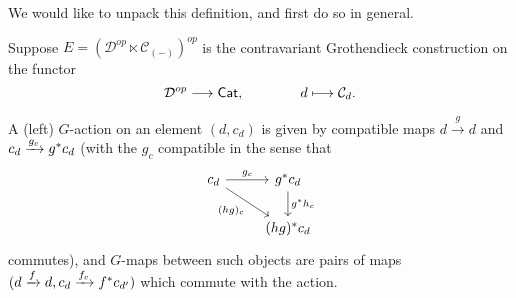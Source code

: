 \documentclass[a4paper,10pt
,draft
]{article}%
\renewcommand{\1}{\eta}%
\begin{document}

We would like to unpack this definition, and first do so in general.


Suppose $E = (\mathcal D^{op} \ltimes \mathcal C_{(-)})^{op}$ is the contravariant Grothendieck construction on the functor
\begin{equation}
      \mathcal D^{op} \longrightarrow \mathsf{Cat},
      \qquad \qquad
      d \longmapsto \mathcal C_d.
\end{equation}

A (left) $G$-action on an element $(d,c_d)$ is given by compatible maps
$d \xrightarrow{g} d$ and
$c_d \xrightarrow{g_c} g^{\**}c_d$
(with the $g_c$ compatible in the sense that
\begin{equation}
      \begin{tikzcd}
            c_d \arrow[r, "g_c"] \arrow[dr, "(h g)_c"']
            &
            g^{\**} c_d \arrow[d, "g^{\**} h_c"]
            \\
            &
            (h g)^{\**} c_d
      \end{tikzcd}
\end{equation}
commutes),
and $G$-maps between such objects
are pairs of maps $(d \xrightarrow{f} d, c_d \xrightarrow{f_c} f^{\**}c_{d'})$ which commute with the action.
\end{document}
